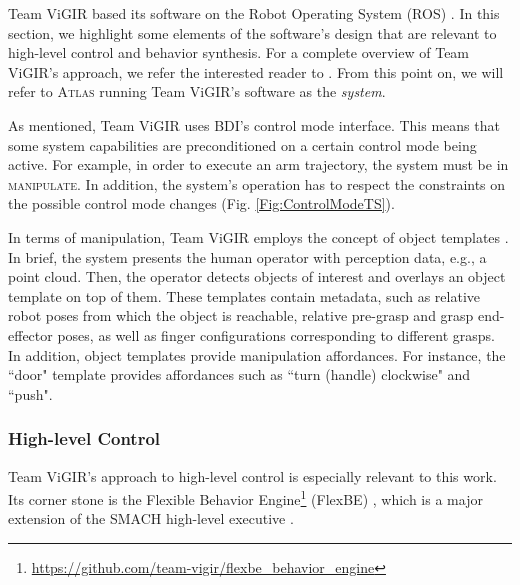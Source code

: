 Team ViGIR based its software on the Robot Operating System (ROS) \cite{ROS2009ICRA, ROS}.
In this section, we highlight some elements of the software's design that are relevant to high-level control and behavior synthesis.
For a complete overview of Team ViGIR's approach, we refer the interested reader to \cite{TeamViGIR2014JFR}.
From this point on, we will refer to \textsc{Atlas} running Team ViGIR's software as the \emph{system}.

As mentioned, Team ViGIR uses BDI's control mode interface.
This means that some system capabilities are preconditioned on a certain control mode being active.
For example, in order to execute an arm trajectory, the system must be in \textsc{manipulate}.
In addition, the system's operation has to respect the constraints on the possible control mode changes (Fig. \ref{Fig:ControlModeTS}).

In terms of manipulation, Team ViGIR employs the concept of object templates \cite{Alberto2014Humanoids}.
In brief, the system presents the human operator with perception data, e.g., a point cloud.
Then, the operator detects objects of interest and overlays an object template on top of them.
These templates contain metadata, such as relative robot poses from which the object is reachable, relative pre-grasp and grasp end-effector poses, as well as finger configurations corresponding to different grasps.
In addition, object templates provide manipulation affordances.
For instance, the ``door" template provides affordances such as ``turn (handle) clockwise" and ``push".

\subsubsection*{High-level Control}\label{S:FlexBE}
Team ViGIR's approach to high-level control is especially relevant to this work.
Its corner stone is the Flexible Behavior Engine\footnote{\scriptsize{\url{https://github.com/team-vigir/flexbe_behavior_engine}}} (FlexBE) \cite{Philipp2013Bsc, Philipp2015Msc}, which is a major extension of the SMACH high-level executive \cite{SMACH2010RAM}.

